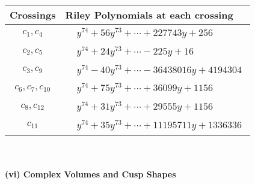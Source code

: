 \documentclass[1p]{elsarticle_modified}
\theoremstyle{definition}
\begin{document}
\begin{tabular}{m{50pt}|m{274pt}}
Crossings & \hspace{64pt}Riley Polynomials at each crossing \\
\hline $$\begin{aligned}c_{1},c_{4}\end{aligned}$$&$\begin{aligned}
&y^{74}+56 y^{73}+\cdots+227743 y+256
\end{aligned}$\\
\hline $$\begin{aligned}c_{2},c_{5}\end{aligned}$$&$\begin{aligned}
&y^{74}+24 y^{73}+\cdots-225 y+16
\end{aligned}$\\
\hline $$\begin{aligned}c_{3},c_{9}\end{aligned}$$&$\begin{aligned}
&y^{74}-40 y^{73}+\cdots-36438016 y+4194304
\end{aligned}$\\
\hline $$\begin{aligned}c_{6},c_{7},c_{10}\end{aligned}$$&$\begin{aligned}
&y^{74}+75 y^{73}+\cdots+36099 y+1156
\end{aligned}$\\
\hline $$\begin{aligned}c_{8},c_{12}\end{aligned}$$&$\begin{aligned}
&y^{74}+31 y^{73}+\cdots+29555 y+1156
\end{aligned}$\\
\hline $$\begin{aligned}c_{11}\end{aligned}$$&$\begin{aligned}
&y^{74}+35 y^{73}+\cdots+11195711 y+1336336
\end{aligned}$\\
\hline
\end{tabular}\\~\\
\newpage\flushleft \textbf{(vi) Complex Volumes and Cusp Shapes}
\end{document}
